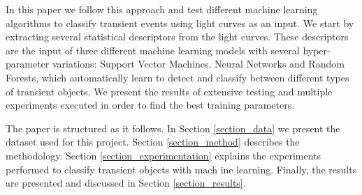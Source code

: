 In this paper we follow this approach and test different machine
learning algorithms to classify transient events using light curves as
an input.  
We start by extracting several statistical descriptors from the light
curves.
These descriptors are the input of three different machine learning
models with several hyper-parameter variations: Support Vector
Machines, Neural Networks and Random Forests, which automatically
learn to detect and classify between different types of transient
objects. 
We present the results of extensive testing and multiple experiments 
executed in order to find the best training parameters. 

The paper is structured as it follows. In Section \ref{section_data}
we present the dataset used for this project. 
Section \ref{section_method} describes the methodology.
Section \ref{section_experimentation} explains the experiments
performed to classify transient objects with mach ine
learning. 
Finally, the results are presented and discussed in
Section \ref{section_results}.  
